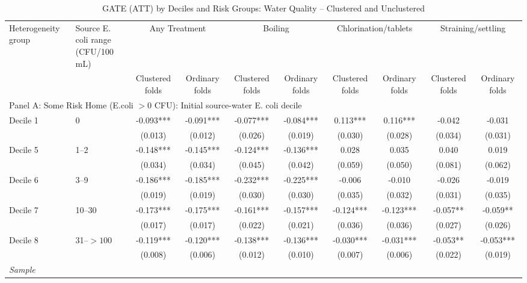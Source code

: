 \begin{landscape}
\begin{table}[p]
\centering
\caption{GATE (ATT) by Deciles and Risk Groups: Water Quality -- Clustered and Unclustered}
\label{tab:table_gate_appendix-ecoli}
\scriptsize\setlength{\tabcolsep}{4pt}
\begin{adjustbox}{max width=\linewidth, center}
\begin{tabular}{llcccccccc}
\toprule
Heterogeneity group & \shortstack{Source E. coli range\\(CFU/100 mL)} & \multicolumn{2}{c}{Any Treatment} & \multicolumn{2}{c}{Boiling} & \multicolumn{2}{c}{Chlorination/tablets} & \multicolumn{2}{c}{Straining/settling} \\
 &  & Clustered folds & Ordinary folds & Clustered folds & Ordinary folds & Clustered folds & Ordinary folds & Clustered folds & Ordinary folds \\
\midrule
\multicolumn{10}{l}{Panel A: Some Risk Home (E.coli $>0$ CFU): Initial source-water E. coli decile} \\
Decile 1 & 0 & -0.093*** & -0.091*** & -0.077*** & -0.084*** & 0.113*** & 0.116*** & -0.042 & -0.031 \\
 &  & (0.013) & (0.012) & (0.026) & (0.019) & (0.030) & (0.028) & (0.034) & (0.031) \\
Decile 5 & 1--2 & -0.148*** & -0.145*** & -0.124*** & -0.136*** & 0.028 & 0.035 & 0.040 & 0.019 \\
 &  & (0.034) & (0.034) & (0.045) & (0.042) & (0.059) & (0.050) & (0.081) & (0.062) \\
Decile 6 & 3--9 & -0.186*** & -0.185*** & -0.232*** & -0.225*** & -0.006 & -0.010 & -0.026 & -0.019 \\
 &  & (0.019) & (0.019) & (0.030) & (0.030) & (0.035) & (0.032) & (0.031) & (0.035) \\
Decile 7 & 10--30 & -0.173*** & -0.175*** & -0.161*** & -0.157*** & -0.124*** & -0.123*** & -0.057** & -0.059** \\
 &  & (0.017) & (0.017) & (0.022) & (0.021) & (0.036) & (0.036) & (0.027) & (0.026) \\
Decile 8 & 31--$>100$ & -0.119*** & -0.120*** & -0.138*** & -0.136*** & -0.030*** & -0.031*** & -0.053** & -0.053*** \\
 &  & (0.008) & (0.006) & (0.012) & (0.010) & (0.007) & (0.006) & (0.022) & (0.019) \\
\multicolumn{10}{l}{\textit{Sample}} \\

\end{tabular}
\end{adjustbox}
\end{table}
\end{landscape}
